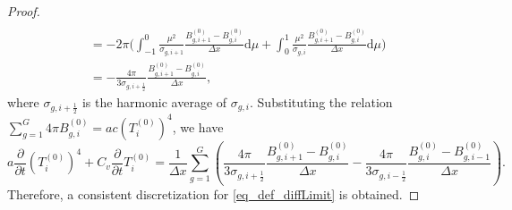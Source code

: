\documentclass[10pt,a4paper]{amsart}
\newcommand{\dd}{{\text{d}}}
\begin{document}
\begin{proof}
\begin{equation*}
\begin{aligned}
              \\
              & = - 2 \pi \Big( \int_{-1}^{0} \frac{ \mu^2}{\sigma_{g,i+1}}  \frac{B^{(0)}_{g,i + 1} - B^{(0)}_{g,i}}{\Delta x} \dd{\mu}  +  \int_{0}^{1} \frac{ \mu^2}{\sigma_{g,i }}  \frac{B^{(0)}_{g,i + 1} - B^{(0)}_{g,i}}{ \Delta x} \dd{\mu}  \Big)
              \\
              & = - \frac{4 \pi}{3 \sigma_{g,i+\frac{1}{2}}} \frac{B^{(0)}_{g,i + 1}- B^{(0)}_{g,i}}{\Delta x},
        \end{aligned}
    \end{equation*}
where $\sigma_{g,i+\frac{1}{2}}$ is the  harmonic average of  $\sigma_{g,i}$. Substituting the relation $\sum_{g=1}^G 4 \pi B_{g,i}^{(0)} = ac (T_{i}^{(0)} )^4$, we have 
    \begin{equation}
 	a \frac{\partial  }{\partial t} (T_{i}^{(0)} )^4 +C_v \frac{\partial }{\partial t} T_i^{(0)} = \frac{1}{\Delta x} \sum_{g=1}^G \left(\frac{4 \pi}{3 \sigma_{g,i+\frac{1}{2}}} \frac{B_{g,i + 1}^{(0)}- B_{g,i}^{(0)}}{\Delta x} - \frac{4 \pi}{3 \sigma_{g,i-\frac{1}{2}}} \frac{B_{g, i}^{(0)}- B_{g,i-1}^{(0)}}{\Delta x} \right).
 \end{equation}
    Therefore, a consistent discretization for \eqref{eq_def_diffLimit} is obtained.
\end{proof}
\end{document}
